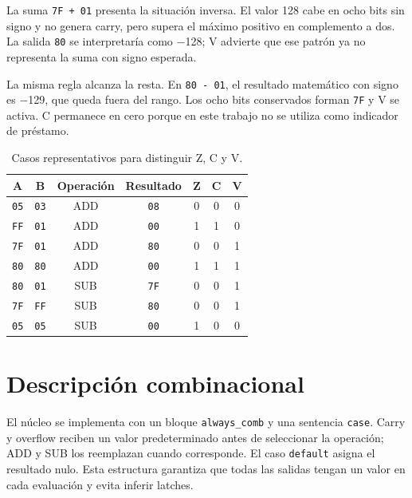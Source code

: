 La suma \texttt{7F + 01} presenta la situación inversa. El valor \num{128}
cabe en ocho bits sin signo y no genera carry, pero supera el máximo
positivo en complemento a dos. La salida \texttt{80} se interpretaría
como \num{-128}; V advierte que ese patrón ya no representa la suma con
signo esperada.

La misma regla alcanza la resta. En \texttt{80 - 01}, el resultado
matemático con signo es \num{-129}, que queda fuera del rango. Los ocho
bits conservados forman \texttt{7F} y V se activa. C permanece en
cero porque en este trabajo no se utiliza como indicador de préstamo.

\begin{table}[H]
  \centering
  \begin{tabular}{ccccccc}
    \toprule
    \textbf{A} & \textbf{B} & \textbf{Operación} & \textbf{Resultado}
    & \textbf{Z} & \textbf{C} & \textbf{V} \\
    \midrule
    \texttt{05} & \texttt{03} & ADD & \texttt{08} & 0 & 0 & 0 \\
    \texttt{FF} & \texttt{01} & ADD & \texttt{00} & 1 & 1 & 0 \\
    \texttt{7F} & \texttt{01} & ADD & \texttt{80} & 0 & 0 & 1 \\
    \texttt{80} & \texttt{80} & ADD & \texttt{00} & 1 & 1 & 1 \\
    \texttt{80} & \texttt{01} & SUB & \texttt{7F} & 0 & 0 & 1 \\
    \texttt{7F} & \texttt{FF} & SUB & \texttt{80} & 0 & 0 & 1 \\
    \texttt{05} & \texttt{05} & SUB & \texttt{00} & 1 & 0 & 0 \\
    \bottomrule
  \end{tabular}
  \caption{Casos representativos para distinguir Z, C y V.}
\end{table}

\section{Descripción combinacional}

El núcleo se implementa con un bloque \texttt{always\_comb} y una
sentencia \texttt{case}. Carry y overflow reciben un valor
predeterminado antes de seleccionar la operación; ADD y SUB los
reemplazan cuando corresponde. El caso \texttt{default} asigna el
resultado nulo. Esta estructura garantiza que todas las salidas
tengan un valor en cada evaluación y evita inferir latches.

